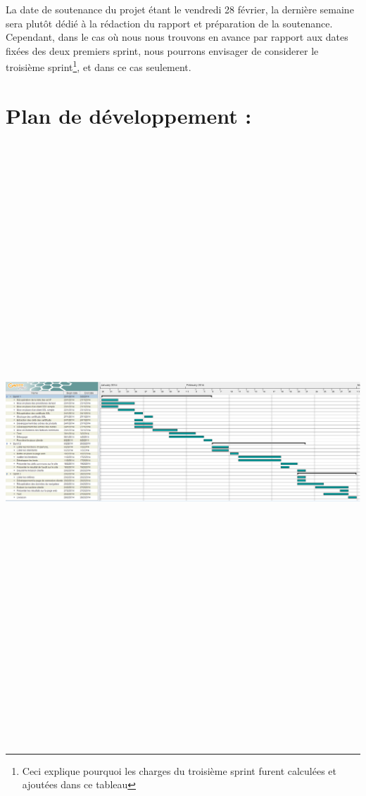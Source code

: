 \documentclass[a4paper,11pt,french]{article}
\begin{document}
La date de soutenance du projet étant le vendredi 28 février, la dernière semaine sera plutôt dédié à la rédaction du rapport et préparation de la soutenance. Cependant, dans le cas où nous nous trouvons en avance par rapport aux dates fixées des deux premiers sprint, nous pourrons envisager de considerer le troisième sprint\footnote{Ceci explique pourquoi les charges du troisième sprint furent calculées et ajoutées dans ce tableau}, et dans ce cas seulement.

\newpage

\section{Plan de développement :}

\begin{center}
\includegraphics[angle=90,height=22.5cm]{gantt-chart_v1.png}
\end{center}
\end{document}

